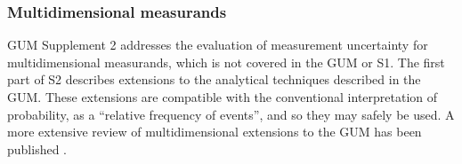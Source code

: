 \subsubsection{Multidimensional measurands}
GUM Supplement 2 addresses the evaluation of measurement uncertainty for multidimensional measurands, which is not covered in the GUM or S1. The first part of S2 describes extensions to the analytical techniques described in the GUM. These extensions are compatible with the conventional interpretation of probability, as a ``relative frequency of events'', and so they may safely be used. A more extensive review of multidimensional extensions to the GUM has been published \cite{HALL_15}.

